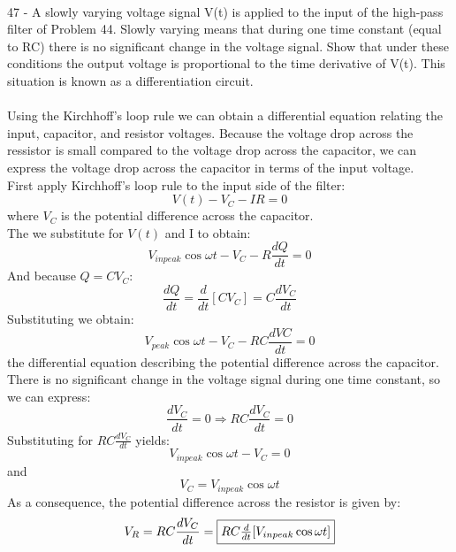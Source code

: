 \documentclass{report}
\begin{document}
\paragraph{}
47 - A slowly varying voltage signal V(t) is applied to the input of the high-pass filter of Problem 44. Slowly varying means that during one time constant (equal to RC) there is no significant change in the voltage signal. Show that under these conditions the output voltage is proportional to the time derivative of V(t). This situation is known as a differentiation circuit.\\
\\
Using the Kirchhoff's loop rule we can obtain a differential equation relating the input, capacitor, and resistor voltages. Because the voltage drop across the ressistor is small compared to the voltage drop across the capacitor, we can express the voltage drop across the capacitor in terms of the input voltage.\\
First apply Kirchhoff's loop rule to the input side of the filter:
$$V(t) - V_C -IR = 0$$
where $V_C$ is the potential difference across the capacitor.\\
The we substitute for $V(t)$ and I to obtain:
$$V_{in peak}\cos \omega t - V_C - R\frac{dQ}{dt} = 0$$
And because $Q = CV_C$:
$$\frac{dQ}{dt} = \frac{d}{dt}[CV_C] = C\frac{dV_C}{dt}$$
Substituting we obtain:
$$V_{peak} \cos \omega t - V_C - RC\frac{dVC}{dt} = 0$$
the differential equation describing the potential difference across the capacitor.\\
There is no significant change in the voltage signal during one time constant, so we can express:
$$\frac{dV_C}{dt} = 0 \Rightarrow RC\frac{dV_C}{dt} = 0$$
Substituting for $RC\frac{dV_C}{dt}$ yields:
$$V_{in peak} \cos \omega t - V_C = 0$$
and
$$V_C = V_{in peak}\cos \omega t$$
As a consequence, the potential difference across the resistor is given by:
$$V_R = RC\frac{dV_C}{dt} = \fbox{$RC\frac{d}{dt}[V_{in peak}\cos \omega t]$}$$
\end{document}
